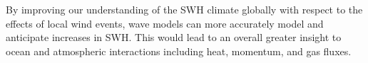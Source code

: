 \documentclass[draft,linenumbers]{agujournal2018}
\begin{document}
By improving our understanding of the SWH climate globally with respect to the effects of local wind events, wave models can more accurately model and anticipate increases in SWH. This would lead to an overall greater insight to ocean and atmospheric interactions including heat, momentum, and gas fluxes. 








%
%
%
%
%
%
%
%
\end{document}
